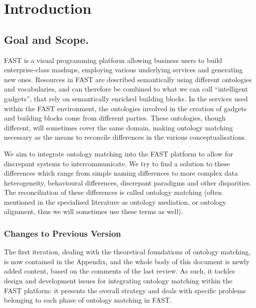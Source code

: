 \documentclass{fast_latex}
\begin{document}
\clearpage
{}


\section{Introduction} %
\label{sec:intro}
\subsection{Goal and Scope.}
FAST is a visual programming platform allowing business users to build enterprise-class mashups, employing various underlying services and generating new ones. Resources in FAST are described semantically using different ontologies and vocabularies, and can therefore be combined to what we can call ``intelligent gadgets'', that rely on semantically enriched building blocks. In the services used within the FAST environment, the ontologies involved in the creation of gadgets and building blocks come from different parties. These ontologies, though different, will sometimes cover the same domain, making ontology matching necessary as the means to reconcile differences in the various conceptualisations.

We aim to integrate ontology matching into the FAST platform to allow for discrepant systems to intercommunicate.  We try to find a solution to these differences which range from simple naming differences to more complex data heterogeneity, behavioural differences, discrepant paradigms and other disparities. The reconciliation of these differences is called ontology matching (often mentioned in the specialised literature as ontology mediation, or ontology alignment, thus we will sometimes use these terms as well). 

\subsubsection{Changes to Previous Version}

The first iteration, dealing with the theoretical foundations of ontology matching, is now contained in the Appendix, and the whole body of this document is newly added content, based on the comments of the last review. As such, it tackles design and development issues for integrating ontology matching within the FAST platform: it presents the overall strategy and deals with specific problems belonging to each phase of ontology matching in FAST.
\end{document}
